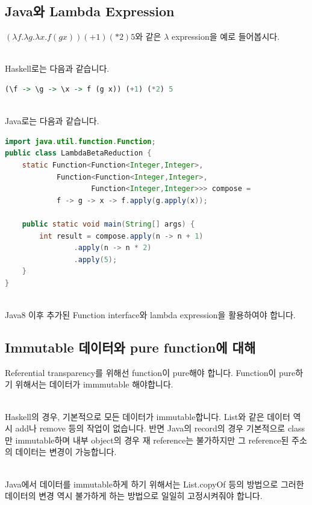\documentclass[runningheads]{llncs}
\begin{document}
\subsection{Java와 Lambda Expression}

$(λf. λg. λx. f (g x)) (+1) (*2) 5$와 같은 $\lambda$ expression을 예로 들어봅시다.

\noindent
\\
Haskell로는 다음과 같습니다.\\
\begin{lstlisting}[language=Haskell]
(\f -> \g -> \x -> f (g x)) (+1) (*2) 5 
\end{lstlisting}

\noindent
\\
Java로는 다음과 같습니다.
\begin{lstlisting}[language=Java]
import java.util.function.Function;
public class LambdaBetaReduction {
    static Function<Function<Integer,Integer>,
            Function<Function<Integer,Integer>,
                    Function<Integer,Integer>>> compose =
            f -> g -> x -> f.apply(g.apply(x));

    public static void main(String[] args) {
        int result = compose.apply(n -> n + 1)
                .apply(n -> n * 2)
                .apply(5);
    }
}    
\end{lstlisting}

\noindent
\\
Java8 이후 추가된 Function interface와 lambda expression을 활용하여야 합니다.

\subsection{Immutable 데이터와 pure function에 대해}

Referential transparency를 위해선 function이 pure해야 합니다. Function이 pure하기 위해서는 데이터가 immmutable 해야합니다.

\noindent
\\
Haskell의 경우, 기본적으로 모든 데이터가 immutable합니다. List와 같은 데이터 역시 add나 remove 등의 작업이 없습니다\cite{ref_haskell_list}.
반면 Java의 record의 경우 기본적으로 class만 immutable하며 내부 object의 경우 재 reference는 불가하지만 그 reference된 주소의 데이터는 변경이 가능합니다.

\noindent
\\
Java에서 데이터를 immutable하게 하기 위해서는 List.copyOf 등의 방법으로 그러한 데이터의 변경 역시 불가하게 하는 방법으로 일일히 고정시켜줘야 합니다.
\end{document}
